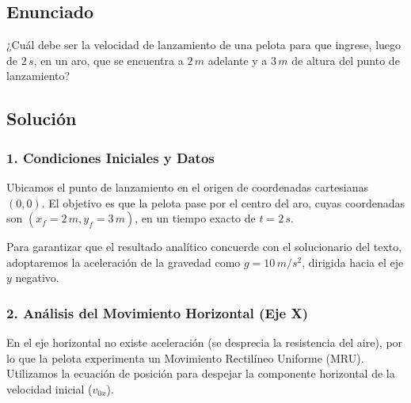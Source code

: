 \documentclass[12pt, a4paper]{article}
\begin{document}
\subsection*{Enunciado}
¿Cuál debe ser la velocidad de lanzamiento de una pelota para que ingrese, luego de $2 \, \si{s}$, en un aro, que se encuentra a $2 \, \si{m}$ adelante y a $3 \, \si{m}$ de altura del punto de lanzamiento? 

\begin{center}
\end{center}

\subsection*{Solución}

\subsubsection*{1. Condiciones Iniciales y Datos}
Ubicamos el punto de lanzamiento en el origen de coordenadas cartesianas $(0,0)$. 
El objetivo es que la pelota pase por el centro del aro, cuyas coordenadas son $(x_f = 2 \, \si{m}, y_f = 3 \, \si{m})$, en un tiempo exacto de $t = 2 \, \si{s}$.

Para garantizar que el resultado analítico concuerde con el solucionario del texto, adoptaremos la aceleración de la gravedad como $g = 10 \, \si{m/s^2}$, dirigida hacia el eje $y$ negativo.

\subsubsection*{2. Análisis del Movimiento Horizontal (Eje X)}
En el eje horizontal no existe aceleración (se desprecia la resistencia del aire), por lo que la pelota experimenta un Movimiento Rectilíneo Uniforme (MRU). Utilizamos la ecuación de posición para despejar la componente horizontal de la velocidad inicial ($v_{0x}$).
\end{document}
